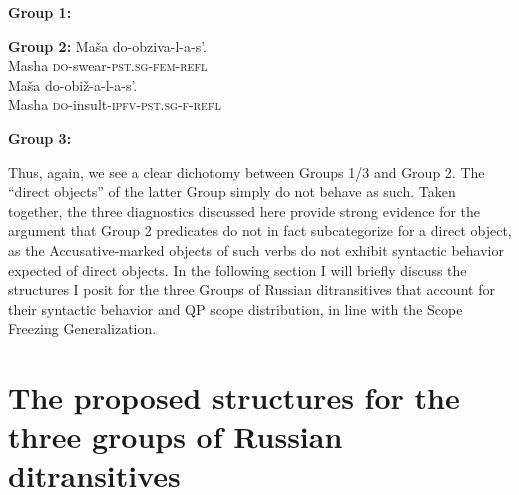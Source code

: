 \documentclass[output=paper,colorlinks,citecolor=brown,modfonts,nonflat]{langsci/langscibook}
\begin{document}
\ea%
    \label{ex:antonyuk:44}
    \textbf{Group 1:}
    \z
\z

\ea%
    \label{ex:antonyuk:45}
    \textbf{Group 2:}
    \ea \label{ex:antonyuk:45a}
    \gll    Maša do-obziva-l-a-s’.\\
            Masha \textsc{do-}swear\textsc{-pst.sg-fem-refl}\\
    \ex \label{ex:antonyuk:45b}
    \gll    Maša do-obiž-a-l-a-s’.\\
            Masha \textsc{do-}insult\textsc{-ipfv-pst.sg-f-refl}\\
    \z
\z

\ea%
    \label{ex:antonyuk:46}
    \textbf{Group 3:}
    \z
\z

Thus, again, we see a clear dichotomy between Groups 1/3 and Group 2. The “direct objects” of the latter Group simply do not behave as such. Taken together, the three diagnostics discussed here provide strong evidence for the argument that Group 2 predicates do not in fact subcategorize for a direct object, as the Accusative-marked objects of such verbs do not exhibit syntactic behavior expected of direct objects. In the following section I will briefly discuss the structures I posit for the three Groups of Russian ditransitives that account for their syntactic behavior and QP scope distribution, in line with the Scope Freezing Generalization.

\section{The proposed structures for the three groups of Russian ditransitives}\label{sec:antonyuk:4}
\end{document}
